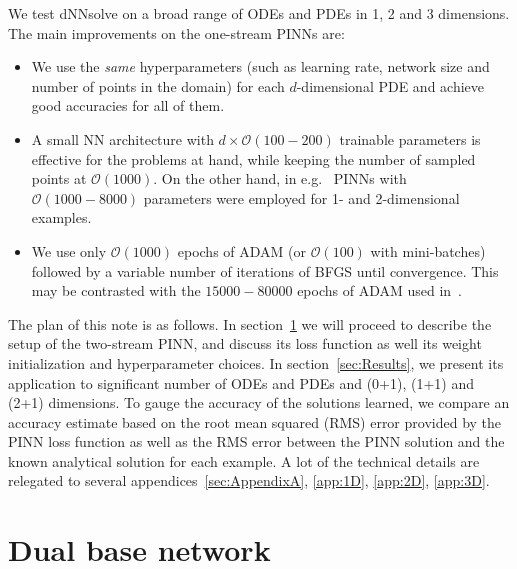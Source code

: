 \documentclass{article}
\begin{document}
We test \textsf{dNNsolve} on a broad range of ODEs and PDEs in 1, 2 and 3 dimensions. The main improvements on the one-stream PINNs are:
\begin{itemize}
\item We use the \textit{same} hyperparameters (such as learning rate, network size and number of points in the domain) for each $d$-dimensional PDE and achieve good accuracies for all of them.
\item A small NN architecture with $d\times \mathcal{O}(100-200)$ trainable parameters is effective for the problems at hand, while keeping the number of sampled points at $\mathcal{O}(1000)$. On the other hand, in e.g.~\cite{lu2020deepxde} PINNs with $ \mathcal{O}(1000-8000)$ parameters were employed for 1- and 2-dimensional examples.
\item We use only $\mathcal{O}(1000)$ epochs of ADAM (or $\mathcal{O}(100)$ with mini-batches) followed by a variable number of iterations of BFGS until convergence. This may be contrasted with the $15000-80000$ epochs of ADAM used in~\cite{lu2020deepxde}.
\end{itemize}

The plan of this note is as follows. In section~\ref{sec:Architecture} we will proceed to describe the setup of the two-stream PINN, and discuss its loss function as well its weight initialization and hyperparameter choices.
In section~\ref{sec:Results}, we present its application to significant number of ODEs and PDEs and (0+1), (1+1) and (2+1) dimensions. To gauge the accuracy of the solutions learned, we compare an accuracy estimate based on the root mean squared (RMS) error provided by the PINN loss function as well as the RMS error between the PINN solution and the known analytical solution for each example. A lot of the technical details are relegated to several appendices~\ref{sec:AppendixA}, \ref{app:1D}, \ref{app:2D}, \ref{app:3D}.




\section{Dual base network}
\label{sec:Architecture}
\end{document}
